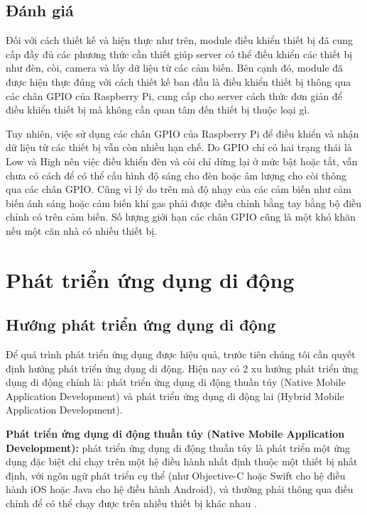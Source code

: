 \documentclass[12pt,a4paper,oneside]{extbook}
\begin{document}
\subsection{Đánh giá}
Đối với cách thiết kế và hiện thực như trên, module điều khiển thiết bị đã cung cấp đầy đủ các phương thức cần thiết giúp server có thể điều khiển các thiết bị như đèn, còi, camera và lấy dữ liệu từ các cảm biến. Bên cạnh đó, module đã được hiện thực đúng với cách thiết kế ban đầu là điều khiển thiết bị thông qua các chân GPIO của Raspberry Pi, cung cấp cho server cách thức đơn giản để điều khiển thiết bị mà không cần quan tâm đến thiết bị thuộc loại gì.

Tuy nhiên, việc sử dụng các chân GPIO của Raspberry Pi để điều khiển và nhận dữ liệu từ các thiết bị vẫn còn nhiều hạn chế. Do GPIO chỉ có hai trạng thái là Low và High nên việc điều khiển đèn và còi chỉ dừng lại ở mức bật hoặc tắt, vẫn chưa có cách để có thể cấu hình độ sáng cho đèn hoặc âm lượng cho còi thông qua các chân GPIO. Cũng vì lý do trên mà độ nhạy của các cảm biến như cảm biến ánh sáng hoặc cảm biến khí gas phải được điều chỉnh bằng tay bằng bộ điều chỉnh có trên cảm biến. Số lượng giới hạn các chân GPIO cũng là một khó khăn nếu một căn nhà có nhiều thiết bị. 

\section{Phát triển ứng dụng di động}
\subsection{Hướng phát triển ứng dụng di động}
Để quá trình phát triển ứng dụng được hiệu quả, trước tiên chúng tôi cần quyết định hướng phát triển ứng dụng di động. Hiện nay có 2 xu hướng phát triển ứng dụng di động chính là: phát triển ứng dụng di động thuần túy (Native Mobile Application Development) và phát triển ứng dụng di động lai (Hybrid Mobile Application Development).

\textbf{Phát triển ứng dụng di động thuần túy (Native Mobile Application Development):} phát triển ứng dụng di động thuần túy là phát triển một ứng dụng đặc biệt chỉ chạy trên một hệ điều hành nhất định thuộc một thiết bị nhất định, với ngôn ngữ phát triển cụ thể (như Objective-C hoặc Swift cho hệ điều hành iOS hoặc Java cho hệ điều hành Android), và thường phải thông qua điều chỉnh để có thể chạy được trên nhiều thiết bị khác nhau \cite{hybrid-vs-native-vn}.
\end{document}
